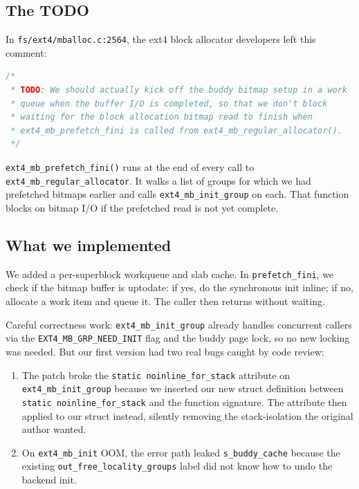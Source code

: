 \documentclass[11pt,a4paper]{article}
\begin{document}
\subsection{The TODO}

In \texttt{fs/ext4/mballoc.c:2564}, the ext4 block allocator
developers left this comment:

\begin{lstlisting}[language=C]
/*
 * TODO: We should actually kick off the buddy bitmap setup in a work
 * queue when the buffer I/O is completed, so that we don't block
 * waiting for the block allocation bitmap read to finish when
 * ext4_mb_prefetch_fini is called from ext4_mb_regular_allocator().
 */
\end{lstlisting}

\texttt{ext4\_mb\_prefetch\_fini()} runs at the end of every call to
\texttt{ext4\_mb\_regular\_allocator}. It walks a list of groups for
which we had prefetched bitmaps earlier and calls
\texttt{ext4\_mb\_init\_group} on each. That function blocks on
bitmap I/O if the prefetched read is not yet complete.

\subsection{What we implemented}

We added a per-superblock workqueue and slab cache. In
\texttt{prefetch\_fini}, we check if the bitmap buffer is uptodate:
if yes, do the synchronous init inline; if no, allocate a work item
and queue it. The caller then returns without waiting.

Careful correctness work: \texttt{ext4\_mb\_init\_group} already
handles concurrent callers via the \texttt{EXT4\_MB\_GRP\_NEED\_INIT}
flag and the buddy page lock, so no new locking was needed. But our
first version had two real bugs caught by code review:
\begin{enumerate}[leftmargin=*]
  \item The patch broke the \texttt{static noinline\_for\_stack}
        attribute on \texttt{ext4\_mb\_init\_group} because we
        inserted our new struct definition between
        \texttt{static noinline\_for\_stack} and the function
        signature. The attribute then applied to our struct
        instead, silently removing the stack-isolation the original
        author wanted.
  \item On \texttt{ext4\_mb\_init} OOM, the error path leaked
        \texttt{s\_buddy\_cache} because the existing
        \texttt{out\_free\_locality\_groups} label did not know how
        to undo the backend init.
\end{enumerate}
\end{document}
